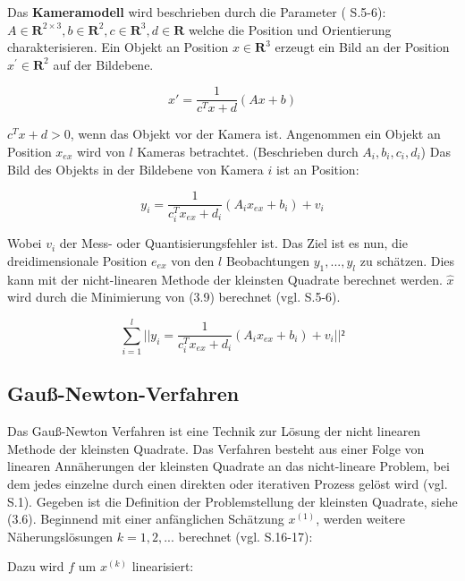 Das \textbf{Kameramodell} wird beschrieben durch die Parameter (\cite{nonlinear_1} S.5-6): $A \in  \textbf{R}^{2\times 3}, b \in \textbf{R}^2, c \in  \textbf{R}^3, d \in \textbf{R}$ welche die Position und Orientierung charakterisieren. Ein Objekt an Position $x \in \textbf{R}^3 $ erzeugt ein Bild an der Position $x^\prime \in \textbf{R}^2$ auf der Bildebene.

\begin{equation}
x \prime = \frac{1}{c^Tx+d} (Ax +b )
\end{equation}

$c^Tx+d >0$, wenn das Objekt vor der Kamera ist. Angenommen ein Objekt an Position $x_{ex}$ wird von $l$ Kameras betrachtet. (Beschrieben durch $A_i,b_i,c_i,d_i$) Das Bild des Objekts in der Bildebene von Kamera $i$ ist an Position:

\begin{equation}
y_i = \frac{1}{c_i^T x_{ex}+d_i}(A_i x_{ex} + b_i) + v_i
\end{equation}

Wobei $v_i$ der Mess- oder Quantisierungsfehler ist. Das Ziel ist es nun, die dreidimensionale Position $e_{ex}$ von den $l$ Beobachtungen $y_1,...,y_l$ zu schätzen. Dies kann mit der nicht-linearen Methode der kleinsten Quadrate berechnet werden. $\hat x$ wird durch die Minimierung von (3.9) berechnet (vgl. \cite{nonlinear_1} S.5-6).

\begin{equation}
\sum_{i=1}^l || y_i = \frac{1}{c_i^T x_{ex}+d_i}(A_i x_{ex} + b_i) + v_i||²
\end{equation}

\subsection{Gauß-Newton-Verfahren}

Das Gauß-Newton Verfahren ist eine Technik zur Lösung der nicht linearen Methode der kleinsten Quadrate. Das Verfahren besteht aus einer Folge von linearen Annäherungen der kleinsten Quadrate an das nicht-lineare Problem, bei dem jedes einzelne durch einen direkten oder iterativen Prozess gelöst wird (vgl. \cite{approx_gn} S.1). Gegeben ist die Definition der Problemstellung der kleinsten Quadrate, siehe (3.6). Beginnend mit einer anfänglichen Schätzung $x^{(1)}$, werden weitere Näherungslösungen $k = 1,2,...$ berechnet (vgl. \cite{nonlinear_1} S.16-17):

Dazu wird $f$ um $x^{(k)}$ linearisiert:

